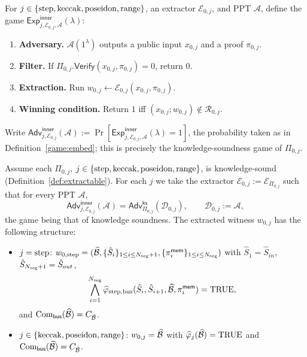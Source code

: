 \begin{definition}\label{game:inner}
For $j\in\{\mathrm{step},\mathrm{keccak},\mathrm{poseidon},\mathrm{range}\}$, an extractor $\mathcal{E}_{0,j}$,
and PPT $\mathcal{A}$, define the game
$\mathsf{Exp}^{\mathsf{inner}}_{j,\mathcal{E}_{0,j},\mathcal{A}}(\lambda)$:
\begin{enumerate}
  \item \textbf{Adversary.} $\mathcal{A}(1^\lambda)$ outputs a public input
    $x_{0,j}$ and a proof $\pi_{0,j}$.
  \item \textbf{Filter.} If $\Pi_{0,j}.\mathsf{Verify}(x_{0,j},\pi_{0,j})=0$,
    return $0$.
  \item \textbf{Extraction.} Run
    $w_{0,j}\leftarrow\mathcal{E}_{0,j}(x_{0,j},\pi_{0,j})$.
  \item \textbf{Winning condition.} Return $1$ iff
    $(x_{0,j};w_{0,j})\notin\mathcal{R}_{0,j}$.
\end{enumerate}
Write $\mathsf{Adv}^{\mathsf{inner}}_{j,\mathcal{E}_{0,j}}(\mathcal{A}) :=
\Pr[\mathsf{Exp}^{\mathsf{inner}}_{j,\mathcal{E}_{0,j},\mathcal{A}}(\lambda)=1]$,
the probability taken as in Definition~\ref{game:embed}; this is precisely the
knowledge-soundness game of $\Pi_{0,j}$.
\end{definition}

\begin{lemma}\label{lem:inner}
Assume each $\Pi_{0,j}$, $j\in\{\mathrm{step},\mathrm{keccak},\mathrm{poseidon},\mathrm{range}\}$, is
knowledge-sound (Definition~\ref{def:extractable}). For each $j$ we take the
extractor $\mathcal{E}_{0,j}:=\mathcal{E}_{\Pi_{0,j}}$ such that for
every PPT $\mathcal{A}$,
\[
  \mathsf{Adv}^{\mathsf{inner}}_{j,\mathcal{E}_{0,j}}(\mathcal{A})
  = \mathsf{Adv}^{\mathsf{ks}}_{\Pi_{0,j}}(\mathcal{D}_{0,j}),
  \qquad \mathcal{D}_{0,j}:=\mathcal{A},
\]
the game being that of knowledge soundness. The extracted witness $w_{0,j}$ has
the following structure:
\begin{itemize}
  \item $j=\mathrm{step}$:
    $w_{0,\mathrm{step}}=(\widehat{\mathcal{B}},\{\hat{S}_i\}_{1\le i\le N_{\mathrm{seg}}+1},
    \{\pi^{\mathsf{mem}}_i\}_{1\le i\le N_{\mathrm{seg}}})$
    with $\hat{S}_1=\hat{S}_{in}$,\; $\hat{S}_{N_{\mathrm{seg}}+1}=\hat{S}_{out}$,\;
\[
  \bigwedge_{i=1}^{N_{\mathrm{seg}}}\widehat{\varphi}_{\mathrm{step},\mathrm{bus}}(\hat{S}_i,\hat{S}_{i+1},\widehat{\mathcal{B}},\pi^{\mathsf{mem}}_i)=\mathrm{TRUE},
\]
    and $\mathrm{Com}_{\mathsf{bus}}(\widehat{\mathcal{B}})=C_{\hat{\mathcal{B}}}$.
  \item $j\in\{\mathrm{keccak},\mathrm{poseidon},\mathrm{range}\}$: $w_{0,j}=\widehat{\mathcal{B}}$ with
    $\widehat{\varphi}_{j}(\widehat{\mathcal{B}})=\mathrm{TRUE}$ and
    $\mathrm{Com}_{\mathsf{bus}}(\widehat{\mathcal{B}})=C_{\hat{\mathcal{B}}}$.
\end{itemize}
\end{lemma}

